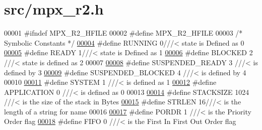 \hypertarget{mpx__r2_8h_source}{
\section{src/mpx\_\-r2.h}
}

\begin{DoxyCode}
00001 \textcolor{preprocessor}{#ifndef MPX\_R2\_HFILE}
00002 \textcolor{preprocessor}{}\textcolor{preprocessor}{#define MPX\_R2\_HFILE}
00003 \textcolor{preprocessor}{}\textcolor{comment}{/* Symbolic Constants */}
\hypertarget{mpx__r2_8h_source_l00004}{}\hyperlink{mpx__r2_8h_a6fb7181d994ee98e735494be55809708}{00004} \textcolor{preprocessor}{#define RUNNING  0///< state is Defined as 0}
\hypertarget{mpx__r2_8h_source_l00005}{}\hyperlink{mpx__r2_8h_ad1235d5ce36f7267285e82dccd428aa6}{00005} \textcolor{preprocessor}{}\textcolor{preprocessor}{#define READY   1///< state is Defined as  1}
\hypertarget{mpx__r2_8h_source_l00006}{}\hyperlink{mpx__r2_8h_a48f6457243719e7031768d4100741159}{00006} \textcolor{preprocessor}{}\textcolor{preprocessor}{#define BLOCKED 2 ///< state is defined as 2}
00007 \textcolor{preprocessor}{}
\hypertarget{mpx__r2_8h_source_l00008}{}\hyperlink{mpx__r2_8h_a07b1141143e8825b04670da23fca8cc7}{00008} \textcolor{preprocessor}{#define SUSPENDED\_READY    3 ///< is defined by 3}
\hypertarget{mpx__r2_8h_source_l00009}{}\hyperlink{mpx__r2_8h_a6e41bb5a80c5049e8d364bab8ee4d73a}{00009} \textcolor{preprocessor}{}\textcolor{preprocessor}{#define SUSPENDED\_BLOCKED  4 ///< is defined by 4}
00010 \textcolor{preprocessor}{}
\hypertarget{mpx__r2_8h_source_l00011}{}\hyperlink{mpx__r2_8h_a21b97df85e65556468b28a576311271c}{00011} \textcolor{preprocessor}{#define SYSTEM  1 ///< is defined as 1}
\hypertarget{mpx__r2_8h_source_l00012}{}\hyperlink{mpx__r2_8h_a796bd7c6ba2e59281760fb155c6287e8}{00012} \textcolor{preprocessor}{}\textcolor{preprocessor}{#define APPLICATION  0  ///< is defined as 0 }
00013 \textcolor{preprocessor}{}
\hypertarget{mpx__r2_8h_source_l00014}{}\hyperlink{mpx__r2_8h_a21d9543c516fffee84a7963224271f95}{00014} \textcolor{preprocessor}{#define STACKSIZE   1024 ///< is the size of the stack in Bytes}
\hypertarget{mpx__r2_8h_source_l00015}{}\hyperlink{mpx__r2_8h_a278cf415676752815cfb411cb0b32802}{00015} \textcolor{preprocessor}{}\textcolor{preprocessor}{#define STRLEN    16///< is the length of a string for name}
00016 \textcolor{preprocessor}{}
\hypertarget{mpx__r2_8h_source_l00017}{}\hyperlink{mpx__r2_8h_ace032edafb5fe32666cf53a1e7a957e0}{00017} \textcolor{preprocessor}{#define PORDR  1 ///< is the Priority Order flag}
\hypertarget{mpx__r2_8h_source_l00018}{}\hyperlink{mpx__r2_8h_af6bc2702f6a1a4bb063b0726d90999da}{00018} \textcolor{preprocessor}{}\textcolor{preprocessor}{#define FIFO   0 ///< is the First In First Out Order flag}

\end{DoxyCode}
